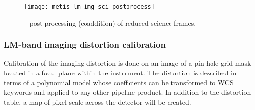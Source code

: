 \begin{figure}[hb]
  \centering
  \texttt{[image: metis\_lm\_img\_sci\_postprocess]}
  \caption[Recipe: ]{%
     -- post-processing (coaddition)
    of reduced  science frames.}
  \label{fig:metis_lm_img_sci_postprocess}
\end{figure}

\clearpage
\subsubsection{LM-band imaging distortion calibration}
\label{lm_img_distortion}
\label{rec:lm_img_distortion}
\label{sssec:lm_img_distortion}

Calibration of the imaging distortion is done on an image of a
pin-hole grid mask located in a focal plane within the instrument. The
distortion is described in terms of a polynomial model whose
coefficients can be transformed to WCS keywords and applied to any
other pipeline product. In addition to the distortion table, a map of
pixel scale across the detector will be created.

